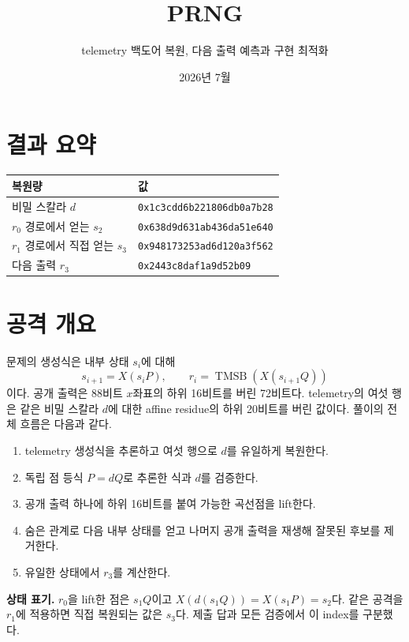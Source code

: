 \documentclass[10pt,a4paper]{article}
\title{PRNG}
\author{telemetry 백도어 복원, 다음 출력 예측과 구현 최적화}
\date{2026년 7월}
\begin{document}
\maketitle

\section*{결과 요약}

\begin{center}
\end{center}

\begin{tabularx}{\linewidth}{@{}lX@{}}
\toprule
복원량 & 값\\
\midrule
비밀 스칼라 \(d\) &
\texttt{0x1c3cdd6b221806db0a7b28}\\
\(r_0\) 경로에서 얻는 \(s_2\) &
\texttt{0x638d9d631ab436da51e640}\\
\(r_1\) 경로에서 직접 얻는 \(s_3\) &
\texttt{0x948173253ad6d120a3f562}\\
다음 출력 \(r_3\) &
\texttt{0x2443c8daf1a9d52b09}\\
\bottomrule
\end{tabularx}

\section{공격 개요}

문제의 생성식은 내부 상태 \(s_i\)에 대해
\[
  s_{i+1}=X(s_iP),\qquad
  r_i=\operatorname{TMSB}(X(s_{i+1}Q))
\]
이다. 공개 출력은 88비트 \(x\)좌표의 하위 16비트를 버린 72비트다.
telemetry의 여섯 행은 같은 비밀 스칼라 \(d\)에 대한 affine residue의
하위 20비트를 버린 값이다. 풀이의 전체 흐름은 다음과 같다.

\begin{enumerate}
  \item telemetry 생성식을 추론하고 여섯 행으로 \(d\)를 유일하게 복원한다.
  \item 독립 점 등식 \(P=dQ\)로 추론한 식과 \(d\)를 검증한다.
  \item 공개 출력 하나에 하위 16비트를 붙여 가능한 곡선점을 lift한다.
  \item 숨은 관계로 다음 내부 상태를 얻고 나머지 공개 출력을 재생해
        잘못된 후보를 제거한다.
  \item 유일한 상태에서 \(r_3\)를 계산한다.
\end{enumerate}

\textbf{상태 표기.}
\(r_0\)을 lift한 점은 \(s_1Q\)이고 \(X(d(s_1Q))=X(s_1P)=s_2\)다.
같은 공격을 \(r_1\)에 적용하면 직접 복원되는 값은 \(s_3\)다.
제출 답과 모든 검증에서 이 index를 구분했다.
\end{document}
